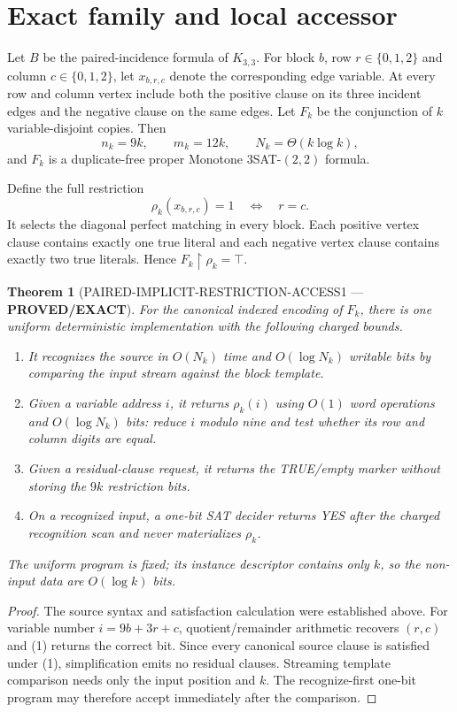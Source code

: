 \documentclass[11pt]{article}
\newcommand{\EXACT}{\textbf{PROVED/EXACT}}
\newtheorem{theorem}{Theorem}
\begin{document}
\section{Exact family and local accessor}
Let $B$ be the paired-incidence formula of $K_{3,3}$.  For block $b$, row
$r\in\{0,1,2\}$ and column $c\in\{0,1,2\}$, let $x_{b,r,c}$ denote the
corresponding edge variable.  At every row and column vertex include both the
positive clause on its three incident edges and the negative clause on the
same edges.  Let $F_k$ be the conjunction of $k$ variable-disjoint copies.
Then
\[
 n_k=9k,\qquad m_k=12k,\qquad N_k=\Theta(k\log k),
\]
and $F_k$ is a duplicate-free proper Monotone $3$SAT-$(2,2)$ formula.

Define the full restriction
\[
 \rho_k(x_{b,r,c})=1\quad\Longleftrightarrow\quad r=c.
 \tag{1}
\]
It selects the diagonal perfect matching in every block.  Each positive
vertex clause contains exactly one true literal and each negative vertex
clause contains exactly two true literals.  Hence
$F_k\upharpoonright\rho_k=\top$.

\begin{theorem}[PAIRED-IMPLICIT-RESTRICTION-ACCESS1 --- \EXACT]
For the canonical indexed encoding of $F_k$, there is one uniform
deterministic implementation with the following charged bounds.
\begin{enumerate}[leftmargin=1.6em]
\item It recognizes the source in $O(N_k)$ time and $O(\log N_k)$ writable
bits by comparing the input stream against the block template.
\item Given a variable address $i$, it returns $\rho_k(i)$ using
$O(1)$ word operations and $O(\log N_k)$ bits: reduce $i$ modulo nine and
test whether its row and column digits are equal.
\item Given a residual-clause request, it returns the TRUE/empty marker
without storing the $9k$ restriction bits.
\item On a recognized input, a one-bit SAT decider returns YES after the
charged recognition scan and never materializes $\rho_k$.
\end{enumerate}
The uniform program is fixed; its instance descriptor contains only $k$, so
the non-input data are $O(\log k)$ bits.
\end{theorem}
\begin{proof}
The source syntax and satisfaction calculation were established above.
For variable number $i=9b+3r+c$, quotient/remainder arithmetic recovers
$(r,c)$ and (1) returns the correct bit.  Since every canonical source clause
is satisfied under (1), simplification emits no residual clauses.  Streaming
template comparison needs only the input position and $k$.  The recognize-first
one-bit program may therefore accept immediately after the comparison.
\end{proof}
\end{document}
